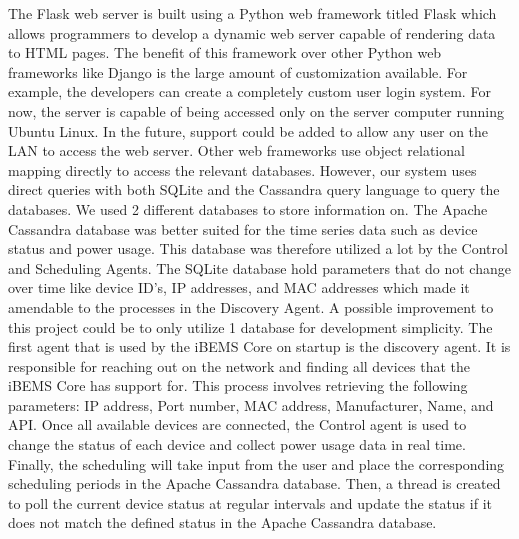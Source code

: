 The Flask web server is built using a Python web framework titled Flask which
allows programmers to develop a dynamic web server capable of rendering data to
HTML pages. The benefit of this framework over other Python web frameworks like
Django is the large amount of customization available. For example, the
developers can create a completely custom user login system. For now, the server
is capable of being accessed only on the server computer running Ubuntu Linux.
In the future, support could be added to allow any user on the LAN to access the
web server. Other web frameworks use object relational mapping directly to
access the relevant databases. However, our system uses direct queries with both
SQLite and the Cassandra query language to query the databases. \medbreak We used
2 different databases to store information on. The Apache Cassandra database was
better suited for the time series data such as device status and power usage.
This database was therefore utilized a lot by the Control and Scheduling Agents.
The SQLite database hold parameters that do not change over time like device
ID's, IP addresses, and MAC addresses which made it amendable to the processes
in the Discovery Agent. A possible improvement to this project could be to only
utilize 1 database for development simplicity. \medbreak The first agent that is
used by the iBEMS Core on startup is the discovery agent. It is responsible for
reaching out on the network and finding all devices that the iBEMS Core has
support for. This process involves retrieving the following parameters: IP
address, Port number, MAC address, Manufacturer, Name, and API. Once all
available devices are connected, the Control agent is used to change the status
of each device and collect power usage data in real time. Finally, the
scheduling will take input from the user and place the corresponding scheduling
periods in the Apache Cassandra database. Then, a thread is created to poll the
current device status at regular intervals and update the status if it does not
match the defined status in the Apache Cassandra database.


